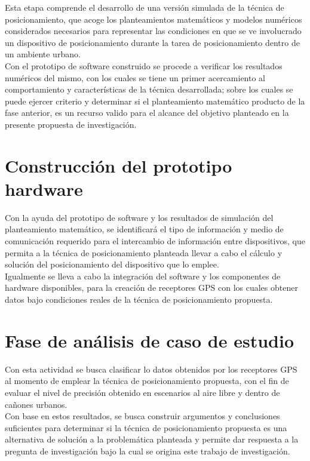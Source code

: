 Esta etapa comprende el desarrollo de una versión simulada de la técnica de posicionamiento, que acoge los planteamientos matemáticos y modelos numéricos considerados necesarios para representar %
las condiciones en que se ve involucrado un dispositivo de posicionamiento durante la tarea de posicionamiento dentro de un ambiente urbano.\\

Con el prototipo de software construido se procede a verificar los  resultados numéricos del mismo, con los cuales se tiene un %
primer acercamiento al comportamiento y características de la técnica desarrollada; sobre los cuales se puede ejercer criterio y determinar si el planteamiento matemático producto de la fase anterior, es un recurso valido para el alcance del objetivo planteado en la presente propuesta de investigación.

\section{Construcción del prototipo hardware}

Con la ayuda del prototipo de software y los resultados de simulación del planteamiento matemático, se identificará el tipo de información y  medio de comunicación requerido para el intercambio de información entre dispositivos, que permita a la técnica de posicionamiento planteada llevar a cabo el cálculo y solución del posicionamiento del dispositivo que lo emplee.\\

Igualmente se lleva a cabo la integración del software y los  componentes de hardware disponibles, para la creación de receptores GPS con los cuales obtener datos bajo condiciones reales de la técnica de posicionamiento propuesta.

\section{Fase de análisis de caso de estudio}

Con esta actividad se busca clasificar lo datos obtenidos por los receptores GPS al momento de emplear la técnica de posicionamiento propuesta, con el fin de evaluar el nivel de precisión obtenido en escenarios al aire libre y dentro de cañones urbanos.\\

Con base en estos resultados, se busca construir argumentos y conclusiones suficientes para determinar si la técnica de posicionamiento propuesta es una alternativa de solución a la problemática planteada y permite dar respuesta a la pregunta de investigación bajo la cual se origina este trabajo de investigación.

